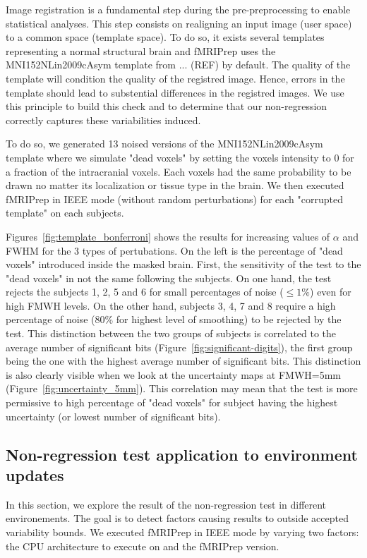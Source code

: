\documentclass{article}
\newcommand{\fmriprep}{fMRIPrep\xspace}
\begin{document}
Image registration is a fundamental step during the pre-preprocessing to enable
statistical analyses. This step consists on realigning an input image (user
space) to a common space (template space). To do so, it exists several templates
representing a normal structural brain and \fmriprep uses the
MNI152NLin2009cAsym template from ... (REF) by default. The quality of the template will
condition the quality of the registred image. Hence, errors in the template
should lead to substential differences in the registred images. We use this
principle to build this check and to determine that our non-regression correctly
captures these variabilities induced.

To do so, we generated 13 noised versions of the MNI152NLin2009cAsym template
where we simulate "dead voxels" by setting the voxels intensity to 0 for a
fraction of the intracranial voxels. Each voxels had the same probability to be
drawn no matter its localization or tissue type in the brain. We then executed
\fmriprep in IEEE mode (without random perturbations) for each "corrupted
template" on each subjects.

Figures~\ref{fig:template_bonferroni} shows the results for increasing values of
$\alpha$ and FWHM for the 3 types of pertubations. On the left is the percentage
of "dead voxels" introduced inside the masked brain. First, the sensitivity of
the test to the "dead voxels" in not the same following the subjects. On one
hand, the test rejects the subjects 1, 2, 5 and 6 for small percentages of noise
($\leq 1\%$) even for high FMWH levels. On the other hand, subjects 3, 4, 7 and
8 require a high percentage of noise (80\% for highest level of smoothing) to be
rejected by the test. This distinction between the two groups of subjects is
correlated to the average number of significant bits
(Figure~\ref{fig:significant-digits}), the first group being the one with the
highest average number of significant bits. This distinction is also clearly
visible when we look at the uncertainty maps at FMWH=5mm
(Figure~\ref{fig:uncertainty_5mm}). This correlation may mean that
the test is more permissive to high percentage of "dead voxels" for
subject having the highest uncertainty (or lowest number of significant bits).

\subsection{Non-regression test application to environment updates}

In this section, we explore the result of the non-regression test in different
environements. The goal is to detect factors causing results to outside accepted
variability bounds. We executed \fmriprep in IEEE mode by varying two factors:
the CPU architecture to execute on and the \fmriprep version.
\end{document}
